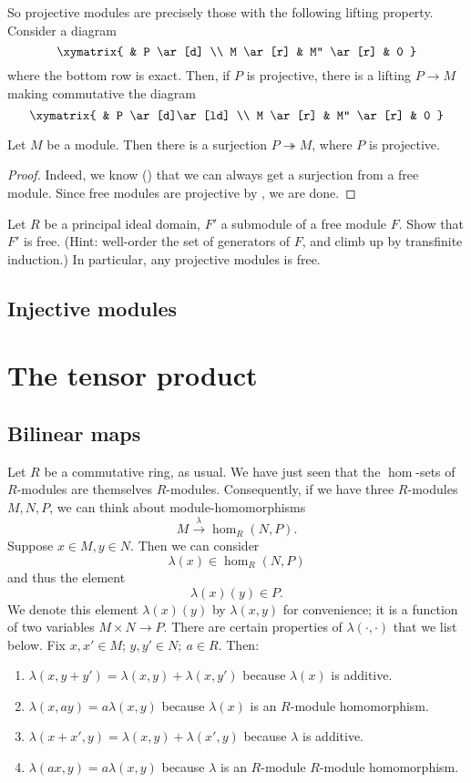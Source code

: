 So projective modules are precisely those with the following lifting property.
Consider a diagram
\[ \xymatrix{
& P \ar[d] \\
M \ar[r] & M'' \ar[r] &  0
}\]
where the bottom row is exact. Then, if $P$ is projective, there is a lifting
$P \to M$ making commutative the diagram
\[ \xymatrix{
& P \ar[d]\ar[ld] \\
M \ar[r] & M'' \ar[r] &  0
}\]

\begin{corollary}
Let $M$ be a module. Then there is a surjection $P \twoheadrightarrow M$,
where $P$ is projective.
\end{corollary}
\begin{proof}
Indeed, we know (\rref{}) that we can always get a surjection from a free
module. Since free modules are projective by , we are
done.
\end{proof}

\begin{exercise}
Let $R$ be a principal ideal domain, $F'$ a submodule of a free module
$F$. Show that
$F'$ is free. (Hint: well-order the set of generators of $F$, and climb up by
transfinite induction.)
In particular, any projective modules is free.
\end{exercise}

\subsection{Injective modules}

\section{The tensor product}

\subsection{Bilinear maps}
Let $R$ be a commutative ring, as usual.
We have just seen that the $\hom$-sets of $R$-modules are themselves
$R$-modules.
Consequently, if we have three $R$-modules $M,N,P$, we can think about
module-homomorphisms
\[ M \stackrel{\lambda}{\to}\hom_R(N,P).  \]
Suppose $x \in M, y \in N$.  Then we can consider
\[ \lambda(x) \in \hom_R(N,P)  \]
and thus the element
\[ \lambda(x)(y) \in P.  \]
We denote this element $\lambda(x)(y)$ by $\lambda(x,y)$ for convenience; it
is a function of two variables $M \times N \to P$. There are
certain properties of $\lambda(\cdot, \cdot)$ that we list below.
Fix $x , x' \in M$; $y, y' \in N; \ a \in R$. Then:
\begin{enumerate}
\item  $\lambda(x,y+y') = \lambda(x,y) + \lambda(x, y')$ because $\lambda(x)$
is
 additive.
\item  $\lambda(x, ay) = a \lambda(x,y)$ because $\lambda(x)$ is an
$R$-module homomorphism.
\item  $\lambda(x+x', y) = \lambda(x,y) + \lambda(x', y)$ because
$\lambda$ is additive.
\item   $\lambda(ax, y) = a\lambda(x,y)$ because $\lambda$ is an $R$-module
$R$-module homomorphism.
\end{enumerate}

